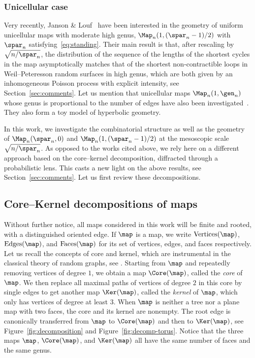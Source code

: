 \subsubsection*{Unicellular case} Very recently, Janson \& Louf~\cite{JL21b} have been interested in the geometry of uniform unicellular maps with moderate high genus, \ie $\Map_n(1, (\spar_{n}-1)/2)$ with $\spar_n$ satisfying~\eqref{eq:standing}. Their main result is that, after rescaling by $ \sqrt{n/\spar_n}$, the distribution of the sequence of the lengths of the shortest cycles in the map asymptotically matches that of the shortest non-contractible loops in Weil--Peteresson random surfaces in high genus, which are both given by an inhomogeneous Poisson process with explicit intensity, see Section~\ref{sec:comments}. Let us mention that unicellular maps $ \Map_n(1, \gen_{n})$ whose genus is proportional to the number of edges
have also been investigated~\cite{ACCR13,JL22,Ray15}. They also form a toy model of hyperbolic geometry.

\smallskip
In this work, we investigate the combinatorial structure as well as the geometry of $\Map_n(\spar_{n},0)$ and $\Map_n(1, (\spar_{n}-1)/2)$ at the mesoscopic scale $ \sqrt{n/ \spar_n}$. As opposed to the works cited above, we rely here on a different approach based on the core--kernel decomposition, diffracted through a probabilistic lens. This casts a new light on the above results, see Section~\ref{sec:comments}. Let us first review these decompositions.

\subsection{Core--Kernel decompositions of maps}
Without further notice, all maps considered in this work will be finite and rooted, \ie with a distinguished oriented edge.
If $\map$ is a map, we write $\mathrm{Vertices}(\map)$, $\mathrm{Edges}(\map)$, and $\mathrm{Faces}(\map)$ for its set of vertices, edges, and faces respectively.
Let us recall the concepts of core and kernel, which are instrumental in the classical theory of random graphs, see \eg \cite{JKLP93,Luc91,NRR15,NR18,Lou21,CMS09,Cha10}. Starting from $ \map$ and repeatedly removing vertices of degree $1$, we obtain a map $ \Core(\map)$, called the \emph{core} of $\map$.
We then replace all maximal paths of vertices of degree $2$ in this core by single edges to get another map $ \Ker(\map)$, called the \emph{kernel} of $\map$, which only has vertices of degree at least $3$.
When $ \map$ is neither a tree nor a plane map with two faces, the core and its kernel are nonempty.
The root edge is canonically transferred from $ \map$ to $ \Core(\map)$ and then to $ \Ker(\map)$, see Figure~\ref{fig:decomposition} and Figure~\ref{fig:decomp-torus}. Notice that the three maps $\map$, $ \Core(\map)$, and $ \Ker(\map)$ all have the same number of faces and the same genus.

